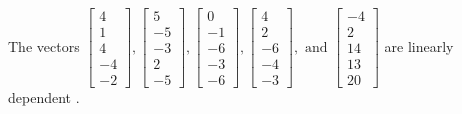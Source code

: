 \begin{exercise}
\begin{exerciseStatement}
  \end{exerciseStatement}
  \begin{exerciseAnswer}
   The vectors \(\left[\begin{array}{r}
4 \\
1 \\
4 \\
-4 \\
-2
\end{array}\right] , \left[\begin{array}{r}
5 \\
-5 \\
-3 \\
2 \\
-5
\end{array}\right] , \left[\begin{array}{r}
0 \\
-1 \\
-6 \\
-3 \\
-6
\end{array}\right] , \left[\begin{array}{r}
4 \\
2 \\
-6 \\
-4 \\
-3
\end{array}\right] , \text{ and } \left[\begin{array}{r}
-4 \\
2 \\
14 \\
13 \\
20
\end{array}\right]\) are 
  	 linearly dependent  .
  


  \end{exerciseAnswer}
\end{exercise}
